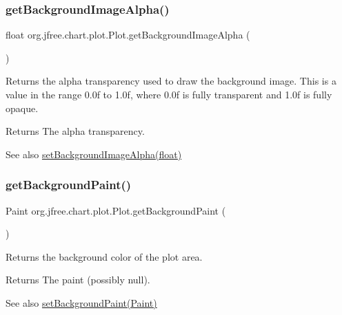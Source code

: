 \subsubsection{\texorpdfstring{get\+Background\+Image\+Alpha()}{getBackgroundImageAlpha()}}
{\footnotesize\ttfamily float org.\+jfree.\+chart.\+plot.\+Plot.\+get\+Background\+Image\+Alpha (\begin{DoxyParamCaption}{ }\end{DoxyParamCaption})}

Returns the alpha transparency used to draw the background image. This is a value in the range 0.\+0f to 1.\+0f, where 0.\+0f is fully transparent and 1.\+0f is fully opaque.

\begin{DoxyReturn}{Returns}
The alpha transparency.
\end{DoxyReturn}
\begin{DoxySeeAlso}{See also}
\mbox{\hyperlink{classorg_1_1jfree_1_1chart_1_1plot_1_1_plot_a054791107eb3a070dec492dbd1901b04}{set\+Background\+Image\+Alpha(float)}} 
\end{DoxySeeAlso}
\mbox{\label{classorg_1_1jfree_1_1chart_1_1plot_1_1_plot_aea2235170b06d5107e49522a96d7d19f}} 
\subsubsection{\texorpdfstring{get\+Background\+Paint()}{getBackgroundPaint()}}
{\footnotesize\ttfamily Paint org.\+jfree.\+chart.\+plot.\+Plot.\+get\+Background\+Paint (\begin{DoxyParamCaption}{ }\end{DoxyParamCaption})}

Returns the background color of the plot area.

\begin{DoxyReturn}{Returns}
The paint (possibly {\ttfamily null}).
\end{DoxyReturn}
\begin{DoxySeeAlso}{See also}
\mbox{\hyperlink{classorg_1_1jfree_1_1chart_1_1plot_1_1_plot_a11a93f1c355ca548ad6b8c6e5b43241d}{set\+Background\+Paint(\+Paint)}} 
\end{DoxySeeAlso}
\mbox{\label{classorg_1_1jfree_1_1chart_1_1plot_1_1_plot_ad2dfcb9fbeb29710b376aa4f9fb3888e}} 
